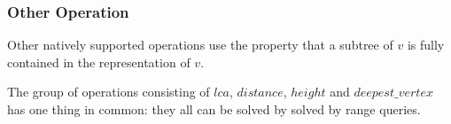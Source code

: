\begin{algorithmic}
		\State {}
	\Else
		\State {}
	\EndIf
\EndFunction
\end{algorithmic}

\begin{algorithmic}
		\State {}
	\Else
		\State {}
	\EndIf
\EndFunction
\end{algorithmic}

\begin{algorithmic}
		\State {}
	\Else
		\State {}
	\EndIf
\EndFunction
\end{algorithmic}

\begin{algorithmic}
		\State {}
	\Else
		\State {}
	\EndIf
\EndFunction
\end{algorithmic}

\subsubsection{Other Operation}

Other natively supported operations use the property that a subtree of $v$ is fully contained in the representation of $v$.

\begin{algorithmic}
	\State {}
\EndFunction
\end{algorithmic}

\begin{algorithmic}
	\State {}
\EndFunction
\end{algorithmic}

\begin{algorithmic}
	\State {}
\EndFunction
\end{algorithmic}

The group of operations consisting of $lca$, $distance$, $height$ and $deepest\_vertex$ has one thing in common: they all can be solved by solved by range queries.

\begin{algorithmic}
		\State {}
		\State {}
	\Else
		\State {}
	\EndIf
\EndFunction
\end{algorithmic}

